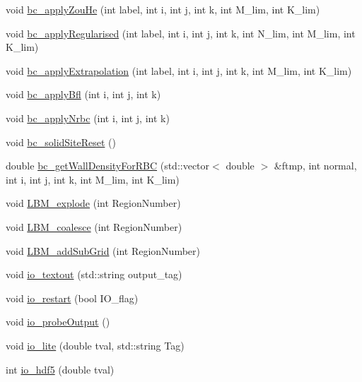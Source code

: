 \begin{DoxyCompactItemize}
\item 
void \hyperlink{class_grid_obj_a47ce1726eff9ce4f1d5fd2b1c3f7c237}{bc\+\_\+apply\+Zou\+He} (int label, int i, int j, int k, int M\+\_\+lim, int K\+\_\+lim)
\item 
void \hyperlink{class_grid_obj_af36e2349c2520b34649de94dcb860838}{bc\+\_\+apply\+Regularised} (int label, int i, int j, int k, int N\+\_\+lim, int M\+\_\+lim, int K\+\_\+lim)
\item 
void \hyperlink{class_grid_obj_ad6306470f559f995c441034c28e9d944}{bc\+\_\+apply\+Extrapolation} (int label, int i, int j, int k, int M\+\_\+lim, int K\+\_\+lim)
\item 
void \hyperlink{class_grid_obj_aeff3b54617b7ae65f08c96e653f9035f}{bc\+\_\+apply\+Bfl} (int i, int j, int k)
\item 
void \hyperlink{class_grid_obj_ae4fd999e7334c8ec8e1118c92e0c7338}{bc\+\_\+apply\+Nrbc} (int i, int j, int k)
\item 
void \hyperlink{class_grid_obj_ac86a233f9475084226e6bf651ffe398f}{bc\+\_\+solid\+Site\+Reset} ()
\item 
double \hyperlink{class_grid_obj_ace9fef8d2c583ea5805b77c999b0684c}{bc\+\_\+get\+Wall\+Density\+For\+R\+BC} (std\+::vector$<$ double $>$ \&ftmp, int normal, int i, int j, int k, int M\+\_\+lim, int K\+\_\+lim)
\item 
void \hyperlink{class_grid_obj_ad8086651bd7b978e0b9c48d56c3d0595}{L\+B\+M\+\_\+explode} (int Region\+Number)
\item 
void \hyperlink{class_grid_obj_a5832081a70e8990be62317034bb975c6}{L\+B\+M\+\_\+coalesce} (int Region\+Number)
\item 
void \hyperlink{class_grid_obj_ab0d47be7ccafaa84b5d43da69e2082b9}{L\+B\+M\+\_\+add\+Sub\+Grid} (int Region\+Number)
\item 
void \hyperlink{class_grid_obj_a1f334215b7789ea1ad8e2d1e15c67fb2}{io\+\_\+textout} (std\+::string output\+\_\+tag)
\item 
void \hyperlink{class_grid_obj_a940b825873a33b2fc9375f7a8f9bffc7}{io\+\_\+restart} (bool I\+O\+\_\+flag)
\item 
void \hyperlink{class_grid_obj_af7e8782f95d15884d761cc4f1d5926c0}{io\+\_\+probe\+Output} ()
\item 
void \hyperlink{class_grid_obj_acf311bbf350fd48104663eaabebca835}{io\+\_\+lite} (double tval, std\+::string Tag)
\item 
int \hyperlink{class_grid_obj_adc960ac818748b839e81d1375782caa7}{io\+\_\+hdf5} (double tval)
\end{DoxyCompactItemize}
